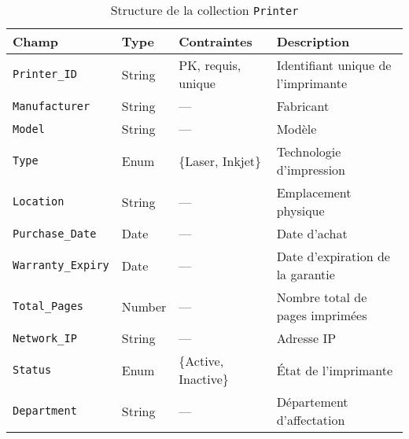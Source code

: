 \documentclass[a4paper,11pt]{report}
\begin{document}
\begin{table}[ht]
  \centering
  \small
  \caption{Structure de la collection \texttt{Printer}}
  \label{tab:printer-schema}
  \begin{tabularx}{\textwidth}{l X l X}
    \toprule
    \bf Champ              & \bf Type    & \bf Contraintes               & \bf Description                              \\
    \midrule
    \texttt{Printer\_ID}      & String     & PK, requis, unique            & Identifiant unique de l’imprimante           \\
    \addlinespace
    \texttt{Manufacturer} & String     & —                             & Fabricant                                    \\
    \addlinespace
    \texttt{Model}        & String     & —                             & Modèle                                       \\
    \addlinespace
    \texttt{Type}         & Enum       & \{Laser, Inkjet\}             & Technologie d’impression                     \\
    \addlinespace
    \texttt{Location}     & String     & —                             & Emplacement physique                         \\
    \addlinespace
    \texttt{Purchase\_Date}& Date       & —                             & Date d’achat                                 \\
    \addlinespace
    \texttt{Warranty\_Expiry}& Date     & —                             & Date d’expiration de la garantie             \\
    \addlinespace
    \texttt{Total\_Pages} & Number     & —                             & Nombre total de pages imprimées              \\
    \addlinespace
    \texttt{Network\_IP}  & String     & —                             & Adresse IP                                   \\
    \addlinespace
    \texttt{Status}       & Enum       & \{Active, Inactive\}          & État de l’imprimante                         \\
    \addlinespace
    \texttt{Department}   & String     & —                             & Département d’affectation                    \\
    \bottomrule
  \end{tabularx}
\end{table}

\vspace{1em}  
\end{document}

